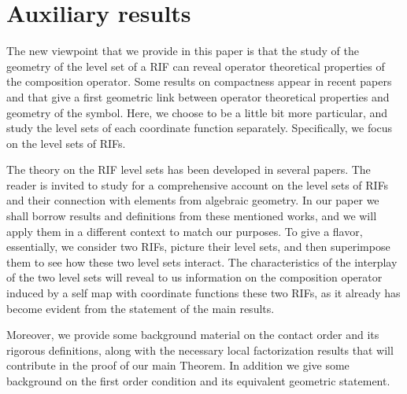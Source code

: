 \documentclass[12pt]{amsart}
\numberwithin{equation}{section}
\begin{document}
\section{Auxiliary results} \label{tools} 
 The new viewpoint that we provide in this paper is that the study of the geometry of the level set of a RIF can reveal operator theoretical properties of the composition operator. Some results on  compactness appear in recent papers \cite{compactness} and \cite{Bayart2} that give a first geometric link between operator theoretical properties and geometry of the symbol. Here, we choose to be a little bit more particular, and study the level sets of each coordinate function separately. Specifically, we focus on the level sets of RIFs. 
 
The theory on the RIF level sets has been developed in several papers. The reader is invited to study \cite{Pisa, AJM, Polonici, Clark1, Clark} for a comprehensive account on the level sets of RIFs and their connection with elements from algebraic geometry. In our paper we shall borrow results and definitions from these mentioned works, and we will apply them in a different context to match our purposes. To give a flavor, essentially, we consider two RIFs, picture their level sets, and then superimpose them to see how these two level sets interact. The characteristics of the interplay of the two level sets will reveal to us information on the composition operator induced by a self map with coordinate functions these two RIFs, as it already has become evident from the statement of the main results.

Moreover, we provide some background material on the contact order and its rigorous definitions, along with the necessary local factorization results that will contribute in the proof of our main Theorem. In addition we give some background on the first order condition and its equivalent geometric statement.
\end{document}

